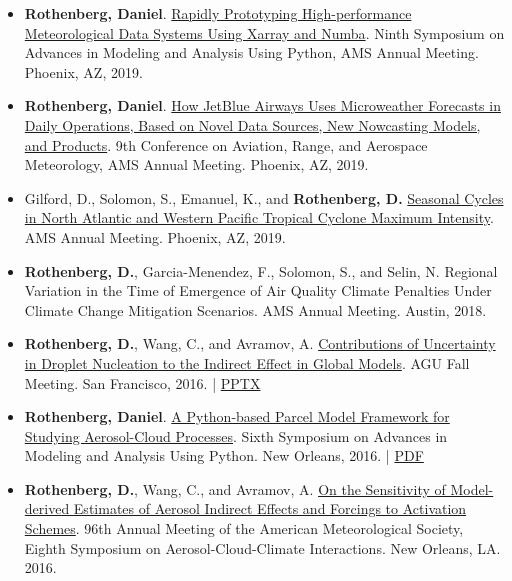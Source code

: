 \documentclass[11pt,letterpaper]{article}
\begin{document}
\begin{itemize}[itemindent=-10pt]
 \item \textbf{Rothenberg, Daniel}. \href{https://ams.confex.com/ams/2019Annual/meetingapp.cgi/Paper/348989}{Rapidly Prototyping High-performance Meteorological Data Systems Using Xarray and Numba}. Ninth Symposium on Advances in Modeling and Analysis Using Python, AMS Annual Meeting. Phoenix, AZ, 2019.
 
 \item \textbf{Rothenberg, Daniel}. \href{https://ams.confex.com/ams/2019Annual/webprogram/Paper353057.html}{How JetBlue Airways Uses Microweather Forecasts in Daily Operations, Based on Novel Data Sources, New Nowcasting Models, and Products}. 9th Conference on Aviation, Range, and Aerospace Meteorology, AMS Annual Meeting. Phoenix, AZ, 2019.

 \item Gilford, D., Solomon, S., Emanuel, K., and \textbf{Rothenberg, D.} \href{https://ams.confex.com/ams/2019Annual/meetingapp.cgi/Paper/349989}{Seasonal Cycles in North Atlantic and Western Pacific Tropical Cyclone Maximum Intensity}. AMS Annual Meeting. Phoenix, AZ, 2019.

 \item \textbf{Rothenberg, D.}, Garcia-Menendez, F., Solomon, S., and Selin, N. Regional Variation in the Time of Emergence of Air Quality Climate Penalties Under Climate Change Mitigation Scenarios. AMS Annual Meeting. Austin, 2018.

 \item \textbf{Rothenberg, D.}, Wang, C., and Avramov, A.
 \href{https://agu.confex.com/agu/fm16/meetingapp.cgi/Paper/193282}{Contributions of Uncertainty in Droplet Nucleation to the Indirect Effect in Global Models}. AGU Fall Meeting. San Francisco, 2016. | \href{https://figshare.com/articles/Contributions_of_Uncertainty_in_Droplet_Nucleation_to_the_Indirect_Effect_in_Global_Models/4503047}{PPTX}

 \item \textbf{Rothenberg, Daniel}. \href{https://ams.confex.com/ams/96Annual/webprogram/Paper286193.html}{A Python-based Parcel Model Framework for Studying Aerosol-Cloud Processes}. Sixth Symposium on Advances in Modeling and Analysis Using Python. New Orleans, 2016. | \href{https://figshare.com/articles/A_Python-based_Parcel_Model_Framework_for_Studying_Aerosol-Cloud_Processes/3475241}{PDF}

 \item \textbf{Rothenberg, D.}, Wang, C., and Avramov, A. \href{https://ams.confex.com/ams/96Annual/webprogram/Paper289914.html}{On the Sensitivity of Model-derived Estimates of Aerosol Indirect Effects and Forcings to Activation Schemes}. 96th Annual Meeting of the American Meteorological Society, Eighth Symposium on Aerosol-Cloud-Climate Interactions. New Orleans, LA. 2016.


\end{itemize}
\end{document}
